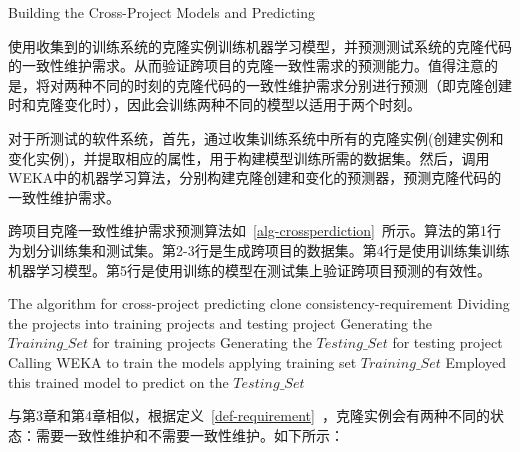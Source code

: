 
{Building the Cross-Project Models and Predicting}

使用收集到的训练系统的克隆实例训练机器学习模型，并预测测试系统的克隆代码的一致性维护需求。从而验证跨项目的克隆一致性需求的预测能力。值得注意的是，将对两种不同的时刻的克隆代码的一致性维护需求分别进行预测（即克隆创建时和克隆变化时），因此会训练两种不同的模型以适用于两个时刻。

对于所测试的软件系统，首先，通过收集训练系统中所有的克隆实例(创建实例和变化实例)，并提取相应的属性，用于构建模型训练所需的数据集。然后，调用WEKA中的机器学习算法，分别构建克隆创建和变化的预测器，预测克隆代码的一致性维护需求。

跨项目克隆一致性维护需求预测算法如~\ref{alg-crossperdiction}~所示。算法的第1行为划分训练集和测试集。第2-3行是生成跨项目的数据集。第4行是使用训练集训练机器学习模型。第5行是使用训练的模型在测试集上验证跨项目预测的有效性。

\begin{minipage}{0.8\textwidth}
\centering
\begin{algorithm}[H]
 {The algorithm for cross-project predicting clone consistency-requirement}
\label{alg-crossperdiction}
Dividing the projects into training projects and testing project\;
Generating the $Training\_{Set}$ for training projects\;
Generating the $Testing\_{Set}$ for testing project\;
Calling WEKA to train the models applying training set $Training\_{Set}$\;
Employed this trained model to predict on the $Testing\_{Set}$\;
\end{algorithm}
\end{minipage}

与第3章和第4章相似，根据定义~\ref{def-requirement}~，克隆实例会有两种不同的状态：需要一致性维护和不需要一致性维护。如下所示：

